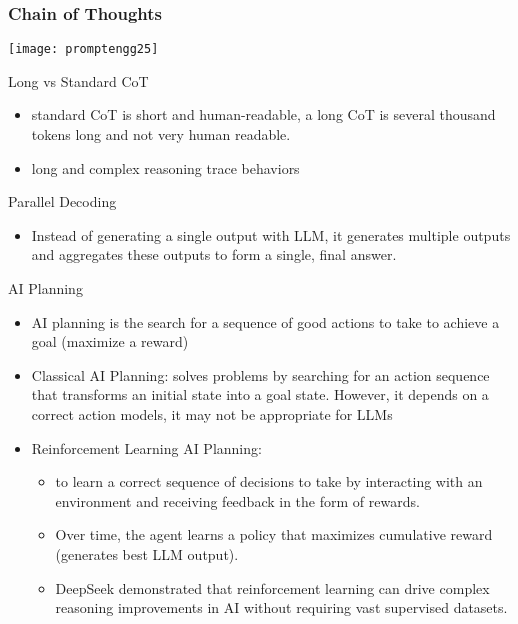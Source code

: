 \begin{frame}[fragile]\frametitle{Chain of Thoughts}
		\begin{center}
		\texttt{[image: promptengg25]}
		\end{center}

\end{frame}


\begin{frame}[fragile]{Long vs Standard CoT}


    \begin{itemize}
        \item  standard CoT is short and human-readable, a long CoT is several thousand tokens long  and not very human readable. 
		\item  long and complex reasoning trace behaviors
    \end{itemize}
\end{frame}

\begin{frame}[fragile]{Parallel Decoding}


    \begin{itemize}
        \item   Instead of generating a single output with LLM, it generates multiple 
outputs and aggregates these outputs to form a single, final answer. 
    \end{itemize}
\end{frame}

\begin{frame}[fragile]{AI Planning}


    \begin{itemize}
        \item AI planning is the search for a sequence of good actions to take to 
achieve a goal (maximize a reward)
\item  Classical AI Planning: solves problems by searching for an action sequence that 
transforms an initial state into a goal state. However, it depends on a correct action models, 
it may not be appropriate for LLMs
\item Reinforcement Learning AI Planning: 
	    \begin{itemize}
        \item to learn a correct sequence of decisions to 
take by interacting with an environment and receiving feedback in the 
form of rewards. 
		\item Over time, the agent learns a policy that maximizes cumulative reward 
(generates best LLM output).  
		\item DeepSeek demonstrated that reinforcement learning can drive complex reasoning improvements in AI without requiring vast supervised datasets.
		\end{itemize}

    \end{itemize}
\end{frame}

